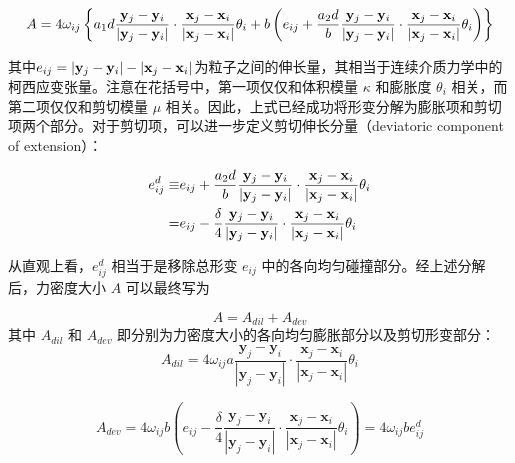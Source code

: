 \begin{equation}
\begin{aligned}
A =4\omega_{ij}\left\{a_1d\frac{\mathbf{y}_j-\mathbf{y}_i}{|\mathbf{y}_j-\mathbf{y}_i|}\cdot\frac{\mathbf{x}_j-\mathbf{x}_i}{|\mathbf{x}_j-\mathbf{x}_i|}\theta_i
   +b\left(e_{ij} + \frac{a_2d}{b}\frac{\mathbf{y}_j-\mathbf{y}_i}{|\mathbf{y}_j-\mathbf{y}_i|}\cdot\frac{\mathbf{x}_j-\mathbf{x}_i}{|\mathbf{x}_j-\mathbf{x}_i|}\theta_i\right) \right\}
\end{aligned}
\end{equation}

其中$e_{ij} = |\mathbf{y}_j - \mathbf{y}_i| - |\mathbf{x}_j - \mathbf{x}_i|$为粒子之间的伸长量，其相当于连续介质力学中的柯西应变张量。注意在花括号中，第一项仅仅和体积模量 $\kappa$ 和膨胀度 $\theta_i$ 相关，而第二项仅仅和剪切模量 $\mu$ 相关。因此，上式已经成功将形变分解为膨胀项和剪切项两个部分。对于剪切项，可以进一步定义剪切伸长分量（deviatoric component of extension）：

\begin{equation}
\begin{aligned}
e^d_{ij} \equiv& e_{ij} + \frac{a_2d}{b}\frac{\mathbf{y}_j-\mathbf{y}_i}{|\mathbf{y}_j-\mathbf{y}_i|}\cdot\frac{\mathbf{x}_j-\mathbf{x}_i}{|\mathbf{x}_j-\mathbf{x}_i|}\theta_i\\
                  =& e_{ij} - \frac{\delta}{4}\frac{\mathbf{y}_j-\mathbf{y}_i}{|\mathbf{y}_j-\mathbf{y}_i|}\cdot\frac{\mathbf{x}_j-\mathbf{x}_i}{|\mathbf{x}_j-\mathbf{x}_i|}\theta_i
\end{aligned}
\label{deviatoric_extension}
\end{equation}

从直观上看，$e^d_{ij}$ 相当于是移除总形变 $e_{ij}$ 中的各向均匀碰撞部分。经上述分解后，力密度大小 $A$ 可以最终写为

\begin{equation}
A = A_{dil} + A_{dev}
\end{equation}
其中 $A_{dil}$ 和 $A_{dev}$ 即分别为力密度大小的各向均匀膨胀部分以及剪切形变部分：
\begin{equation}
A_{dil}=4\omega_{ij}a\frac{\mathbf{y}_j-\mathbf{y}_i}{|\mathbf{y}_j-\mathbf{y}_i|}\cdot\frac{\mathbf{x}_j-\mathbf{x}_i}{|\mathbf{x}_j-\mathbf{x}_i|}\theta_i
\end{equation}

\begin{equation}
A_{dev}=4\omega_{ij}b(e_{ij}-\frac{\delta}{4}\frac{\mathbf{y}_j-\mathbf{y}_i}{|\mathbf{y}_j-\mathbf{y}_i|}\cdot\frac{\mathbf{x}_j-\mathbf{x}_i}{|\mathbf{x}_j-\mathbf{x}_i|}\theta_i)
       =4\omega_{ij}be^d_{ij}
\label{Adev}
\end{equation}

